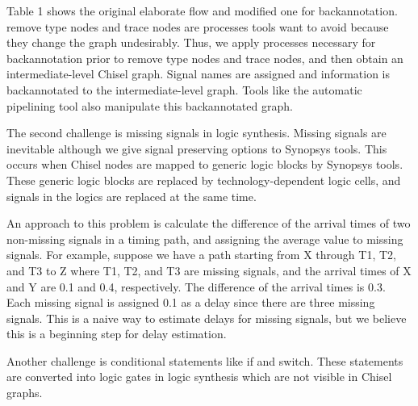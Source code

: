 Table 1 shows the original elaborate flow and modified one for backannotation. remove type nodes and trace nodes are processes tools want to avoid because they change the graph undesirably. Thus, we apply processes necessary for backannotation prior to remove type nodes and trace nodes, and then obtain an intermediate-level Chisel graph. Signal names are assigned and information is backannotated to the intermediate-level graph. Tools like the automatic pipelining tool also manipulate this backannotated graph.

The second challenge is missing signals in logic synthesis. Missing signals are inevitable although we give signal preserving options to Synopsys tools. This occurs when Chisel nodes are mapped to generic logic blocks by Synopsys tools. These generic logic blocks are replaced by technology-dependent logic cells, and signals in the logics are replaced at the same time.

An approach to this problem is calculate the difference of the arrival times of two non-missing signals in a timing path, and assigning the average value to missing signals. For example, suppose we have a path starting from X through T1, T2, and T3 to Z where T1, T2, and T3 are missing signals, and the arrival times of X and Y are 0.1 and 0.4, respectively. The difference of the arrival times is 0.3.  Each missing signal is assigned 0.1 as a delay since there are three missing signals. This is a naive way to estimate delays for missing signals, but we believe this is a beginning step for delay estimation.

Another challenge is conditional statements like if and switch. These statements are converted into logic gates in logic synthesis which are not visible in Chisel graphs. 
